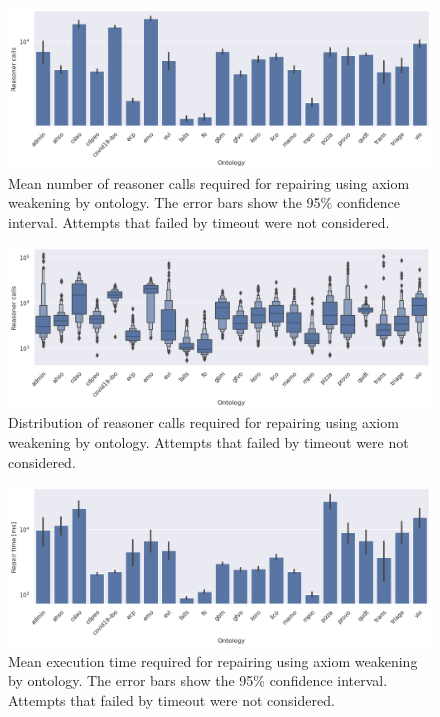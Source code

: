 \begin{figure}[ht]
  \centering
  \includegraphics[width=\textwidth]{resources/calls-ontology-bar.png}
  \caption{Mean number of reasoner calls required for repairing using axiom weakening by ontology. The error bars show the 95\% confidence interval. Attempts that failed by timeout were not considered.}
\end{figure}

\begin{figure}[ht]
  \centering
  \includegraphics[width=\textwidth]{resources/calls-ontology-violin.png}
  \caption{Distribution of reasoner calls required for repairing using axiom weakening by ontology. Attempts that failed by timeout were not considered.}
\end{figure}

\begin{figure}[ht]
  \centering
  \includegraphics[width=\textwidth]{resources/time-ontology-bar.png}
  \caption{Mean execution time required for repairing using axiom weakening by ontology. The error bars show the 95\% confidence interval. Attempts that failed by timeout were not considered.}
\end{figure}

